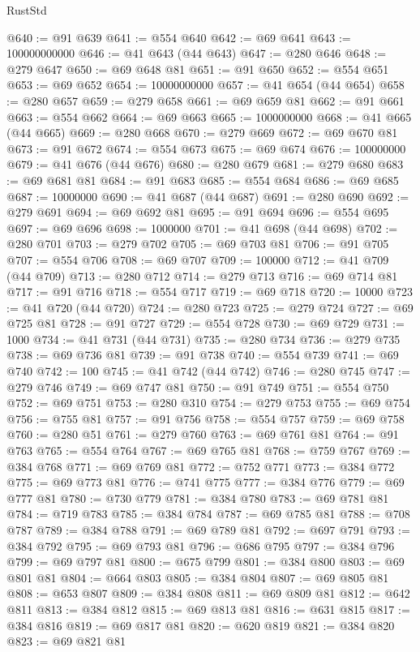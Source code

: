 \begin{lexlean}{RustStd}
\begin{coremodule}
{\begin{coremodule}
{{{{{{{{{{{{{{{{{{{{{{{{{{{{{{@640 := @91 @639
@641 := @554 @640
@642 := @69 @641
@643 := 100000000000
@646 := @41 @643 (@44 @643)
@647 := @280 @646
@648 := @279 @647
@650 := @69 @648 @81
@651 := @91 @650
@652 := @554 @651
@653 := @69 @652
@654 := 10000000000
@657 := @41 @654 (@44 @654)
@658 := @280 @657
@659 := @279 @658
@661 := @69 @659 @81
@662 := @91 @661
@663 := @554 @662
@664 := @69 @663
@665 := 1000000000
@668 := @41 @665 (@44 @665)
@669 := @280 @668
@670 := @279 @669
@672 := @69 @670 @81
@673 := @91 @672
@674 := @554 @673
@675 := @69 @674
@676 := 100000000
@679 := @41 @676 (@44 @676)
@680 := @280 @679
@681 := @279 @680
@683 := @69 @681 @81
@684 := @91 @683
@685 := @554 @684
@686 := @69 @685
@687 := 10000000
@690 := @41 @687 (@44 @687)
@691 := @280 @690
@692 := @279 @691
@694 := @69 @692 @81
@695 := @91 @694
@696 := @554 @695
@697 := @69 @696
@698 := 1000000
@701 := @41 @698 (@44 @698)
@702 := @280 @701
@703 := @279 @702
@705 := @69 @703 @81
@706 := @91 @705
@707 := @554 @706
@708 := @69 @707
@709 := 100000
@712 := @41 @709 (@44 @709)
@713 := @280 @712
@714 := @279 @713
@716 := @69 @714 @81
@717 := @91 @716
@718 := @554 @717
@719 := @69 @718
@720 := 10000
@723 := @41 @720 (@44 @720)
@724 := @280 @723
@725 := @279 @724
@727 := @69 @725 @81
@728 := @91 @727
@729 := @554 @728
@730 := @69 @729
@731 := 1000
@734 := @41 @731 (@44 @731)
@735 := @280 @734
@736 := @279 @735
@738 := @69 @736 @81
@739 := @91 @738
@740 := @554 @739
@741 := @69 @740
@742 := 100
@745 := @41 @742 (@44 @742)
@746 := @280 @745
@747 := @279 @746
@749 := @69 @747 @81
@750 := @91 @749
@751 := @554 @750
@752 := @69 @751
@753 := @280 @310
@754 := @279 @753
@755 := @69 @754
@756 := @755 @81
@757 := @91 @756
@758 := @554 @757
@759 := @69 @758
@760 := @280 @51
@761 := @279 @760
@763 := @69 @761 @81
@764 := @91 @763
@765 := @554 @764
@767 := @69 @765 @81
@768 := @759 @767
@769 := @384 @768
@771 := @69 @769 @81
@772 := @752 @771
@773 := @384 @772
@775 := @69 @773 @81
@776 := @741 @775
@777 := @384 @776
@779 := @69 @777 @81
@780 := @730 @779
@781 := @384 @780
@783 := @69 @781 @81
@784 := @719 @783
@785 := @384 @784
@787 := @69 @785 @81
@788 := @708 @787
@789 := @384 @788
@791 := @69 @789 @81
@792 := @697 @791
@793 := @384 @792
@795 := @69 @793 @81
@796 := @686 @795
@797 := @384 @796
@799 := @69 @797 @81
@800 := @675 @799
@801 := @384 @800
@803 := @69 @801 @81
@804 := @664 @803
@805 := @384 @804
@807 := @69 @805 @81
@808 := @653 @807
@809 := @384 @808
@811 := @69 @809 @81
@812 := @642 @811
@813 := @384 @812
@815 := @69 @813 @81
@816 := @631 @815
@817 := @384 @816
@819 := @69 @817 @81
@820 := @620 @819
@821 := @384 @820
@823 := @69 @821 @81
}}}}}}}}}}}}}}}}}}}}}}}}}}}}}}
\end{coremodule}}
\end{coremodule}
\end{lexlean}
